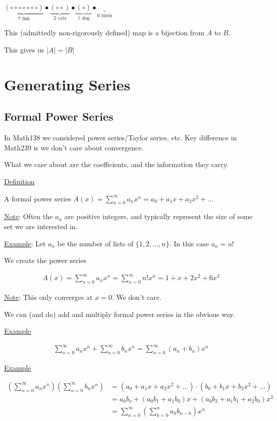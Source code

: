 \documentclass{article}
\begin{document}
$\underbrace{(\circ \circ \circ \circ \circ \circ \circ)}_{\text{7 fish}} \bullet \underbrace{(\circ \circ)}_{\text{2 cats}} \bullet \underbrace{(\circ)}_{\text{1 dog}} \bullet \underbrace{}_{\text{0 birds}}$

This (admittedly non-rigorously defined) map is a bijection from $A$ to $B$. 

This gives us $|A| = |B|$



\section{Generating Series}

\subsection{Formal Power Series}

In Math138 we considered power series/Taylor series, etc. Key difference in Math239 is we don't care about convergence. 

What we care about are the coefficients, and the information they carry. 

\underline{Definition}

A formal power series $A(x) = \sum_{n=0}^{\infty} a_nx^n = a_0 + a_1x + a_2x^2 + \ldots$

\underline{Note}: Often the $a_n$ are positive integers, and typically represent the size of some set we are interested in. 

\underline{Example}: Let $a_n$ be the number of lists of $\{1,2,\ldots,n\}$. In this case $a_n = n!$

We create the power series

\begin{align*}
A(x) = \sum_{n=0}^{\infty} a_nx^n = \sum_{n=0}^{\infty}n!x^n = 1 + x + 2x^2 + 6x^3
\end{align*}

\underline{Note}: This only converges at $x=0$. We don't care. 

We can (and do) add and multiply formal power series in the obvious way. 

\underline{Example}

\begin{align*}
\sum_{n=0}^{\infty}a_nx^n + \sum_{n=0}^{\infty}b_nx^n = \sum_{n=0}^{\infty}(a_n+b_n)x^n
\end{align*}

\underline{Example}

\begin{align*}
(\sum_{n=0}^{\infty}a_nx^n)(\sum_{n=0}^{\infty}b_nx^n) &= 
(a_0 + a_1x + a_2x^2 + \ldots) \cdot (b_0 + b_1x + b_2x^2 + \ldots) \\
&= a_0b_o + (a_0b_1 + a_1b_0)x + (a_0b_2 + a_1b_1 + a_2b_0)x^2 \\
&= \sum_{n=0}^{\infty} (\sum_{k=0}^{n}a_kb_{n-k})x^n
\end{align*}
\end{document}
